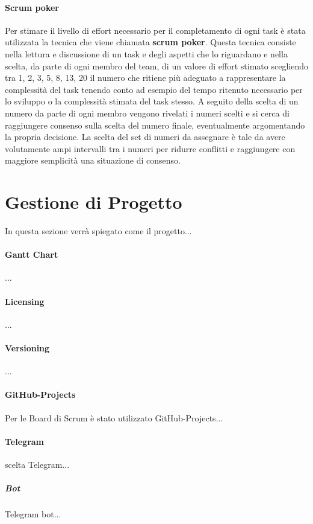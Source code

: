     \paragraph{Scrum poker} Per stimare il livello di effort necessario per il completamento di ogni task è stata utilizzata la tecnica che viene chiamata \textbf{scrum poker}. Questa tecnica consiste nella lettura e discussione di un task e degli aspetti che lo riguardano e nella scelta, da parte di ogni membro del team, di un valore di effort stimato scegliendo tra 1, 2, 3, 5, 8, 13, 20 il numero che ritiene più adeguato a rappresentare la complessità del task tenendo conto ad esempio del tempo ritenuto necessario per lo sviluppo o la complessità stimata del task stesso. A seguito della scelta di un numero da parte di ogni membro vengono rivelati i numeri scelti e si cerca di raggiungere consenso sulla scelta del numero finale, eventualmente argomentando la propria decisione. La scelta del set di numeri da assegnare è tale da avere volutamente ampi intervalli tra i numeri per ridurre conflitti e raggiungere con maggiore semplicità una situazione di consenso.

\section{Gestione di Progetto}
In questa sezione verrà spiegato come il progetto...
    \paragraph{Gantt Chart} 
    ... 
    
    \paragraph{Licensing} 
    ...
    
    \paragraph{Versioning}
    ...
    
    \paragraph{GitHub-Projects}
    Per le Board di Scrum è stato utilizzato GitHub-Projects...
    
    \paragraph{Telegram}
    scelta Telegram...
        \subparagraph{Bot} 
        Telegram bot...
    
